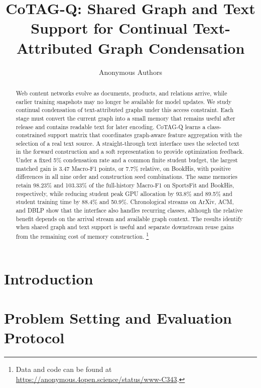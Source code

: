 \documentclass[sigconf,anonymous,review]{acmart}
\title{CoTAG-Q: Shared Graph and Text Support for Continual Text-Attributed Graph Condensation}
\author{Anonymous Authors}
\begin{document}
\begin{abstract}
Web content networks evolve as documents, products, and relations arrive,
while earlier training snapshots may no longer be available for model
updates. We study continual condensation of text-attributed graphs under
this access constraint. Each stage must convert the current graph into a
small memory that remains useful after release and contains readable text
for later encoding. CoTAG-Q learns a class-constrained support matrix that
coordinates graph-aware feature aggregation with the selection of a real
text source. A straight-through text interface uses the selected text in
the forward construction and a soft representation to provide optimization
feedback. Under a fixed 5\% condensation rate and a common finite student
budget, the largest matched gain is 3.47 Macro-F1 points, or 7.7\% relative,
on BookHis, with positive differences in all nine order and construction
seed combinations. The same memories retain 98.23\% and 103.33\% of the
full-history Macro-F1 on SportsFit and BookHis, respectively, while reducing
student peak GPU allocation by 93.8\% and 89.5\% and student training time
by 88.4\% and 50.9\%. Chronological streams on ArXiv, ACM, and DBLP show
that the interface also handles recurring classes, although the relative
benefit depends on the arrival stream and available graph context. The
results identify when shared graph and text support is useful and separate
downstream reuse gains from the remaining cost of memory construction.
\footnote{Data and code can be found at \url{https://anonymous.4open.science/status/www-C343}.}
\end{abstract}



\maketitle

\section{Introduction}


\section{Problem Setting and Evaluation Protocol}
\label{sec:protocol}

\end{document}

